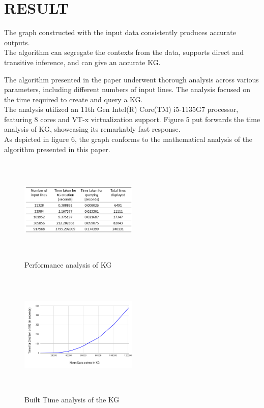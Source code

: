 \documentclass[conference]{IEEEtran}
\begin{document}
\section{RESULT}
The graph constructed with the input data consistently produces accurate outputs.\\
The algorithm can segregate the contexts from the data, supports direct and transitive inference, and can give an accurate KG.

The algorithm presented in the paper underwent thorough analysis across various parameters, including different numbers of input lines. The analysis focused on the time required to create and query a KG.\\
The analysis utilized an 11th Gen Intel(R) Core(TM) i5-1135G7 processor, featuring 8 cores and VT-x virtualization support.
Figure 5 put forwards the time analysis of KG, showcasing its remarkably fast response.
\\
As depicted in figure 6, the graph conforms to the mathematical analysis of the algorithm presented in this paper.


\begin{figure}[htbp]
\centerline{\includegraphics[width=0.5\textwidth , height=5cm]{result_3.png}}
\caption{Performance analysis of KG}
\label{fig}
\end{figure}


\begin{figure}[htbp]
\centerline{\includegraphics[width=0.5\textwidth , height=6cm]{chart_final.png}}
\caption{Built Time analysis of the KG}
\label{fig}
\end{figure}
\end{document}

